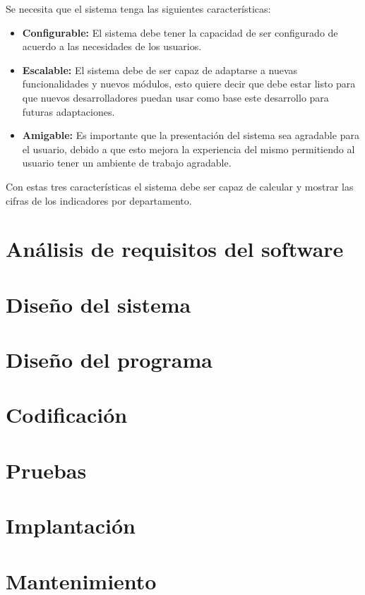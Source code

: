 		Se necesita que el sistema tenga las siguientes caracter\'isticas:

		\begin{itemize}
			\item \textbf{Configurable:} El sistema debe tener la capacidad de ser configurado de acuerdo a las necesidades de los usuarios.
			\item \textbf{Escalable:} El sistema debe de ser capaz de adaptarse a nuevas funcionalidades y nuevos m\'odulos, esto quiere decir que debe estar listo para que nuevos desarrolladores puedan usar como base este desarrollo para futuras adaptaciones.
			\item \textbf{Amigable:} Es importante que la presentaci\'on del sistema sea agradable para el usuario, debido a que esto mejora la experiencia del mismo permitiendo al usuario tener un ambiente de trabajo agradable.
		\end{itemize}
		
		Con estas tres caracter\'isticas el sistema debe ser capaz de calcular y mostrar las cifras de los indicadores por departamento.

	\section{An\'alisis de requisitos del software}
	\section{Dise\~no del sistema}
	\section{Dise\~no del programa}
	\section{Codificaci\'on}
	\section{Pruebas}
	\section{Implantaci\'on}
	\section{Mantenimiento}